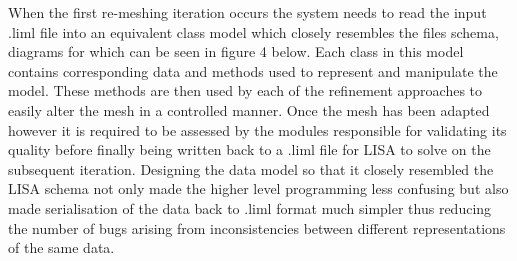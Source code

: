 \noindent
When the first re-meshing iteration occurs the system needs to read the input .liml file into an equivalent class model which closely resembles the files schema, diagrams for which can be seen in figure 4 below. Each class in this model contains corresponding data and methods used to represent and manipulate the model. These methods are then used by each of the refinement approaches to easily alter the mesh in a controlled manner. Once the mesh  has been adapted however it is required to be assessed by the modules responsible for validating its quality before finally being written back to a .liml file for LISA to solve on the subsequent iteration. Designing the data model so that it closely resembled the LISA schema not only made the higher level programming less confusing but also made serialisation of the data back to .liml format much simpler  thus reducing the number of bugs arising from inconsistencies between different representations of the same data. \\

